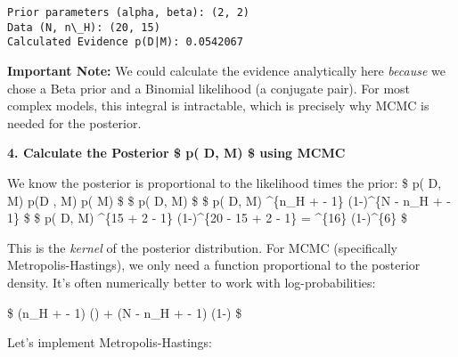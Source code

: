 \documentclass[11pt]{article}
\begin{document}
    \begin{Verbatim}[commandchars=\\\{\}]
Prior parameters (alpha, beta): (2, 2)
Data (N, n\_H): (20, 15)
Calculated Evidence p(D|M): 0.0542067
    \end{Verbatim}

    \textbf{Important Note:} We could calculate the evidence analytically
here \emph{because} we chose a Beta prior and a Binomial likelihood (a
conjugate pair). For most complex models, this integral is intractable,
which is precisely why MCMC is needed for the posterior.

\textbf{4. Calculate the Posterior \$ p(\theta \textbar{} D, M) \$ using
MCMC}

We know the posterior is proportional to the likelihood times the prior:
\$ p(\theta \textbar{} D, M) \propto p(D \textbar{} \theta, M)
p(\theta \textbar{} M) \$ \$ p(\theta \textbar{} D, M)
\propto {}  \$
\$ p(\theta \textbar{} D, M) \propto \theta\^{}\{n\_H + \alpha - 1\}
(1-\theta)\^{}\{N - n\_H + \beta - 1\} \$ \$ p(\theta \textbar{} D, M)
\propto \theta\^{}\{15 + 2 - 1\} (1-\theta)\^{}\{20 - 15 + 2 - 1\} =
\theta\^{}\{16\} (1-\theta)\^{}\{6\} \$

This is the \emph{kernel} of the posterior distribution. For MCMC
(specifically Metropolis-Hastings), we only need a function proportional
to the posterior density. It's often numerically better to work with
log-probabilities:

\$ \log[p(\theta | D, M)] \propto (n\_H + \alpha - 1) \log(\theta) + (N
- n\_H + \beta - 1) \log(1-\theta) \$

Let's implement Metropolis-Hastings:
\end{document}
